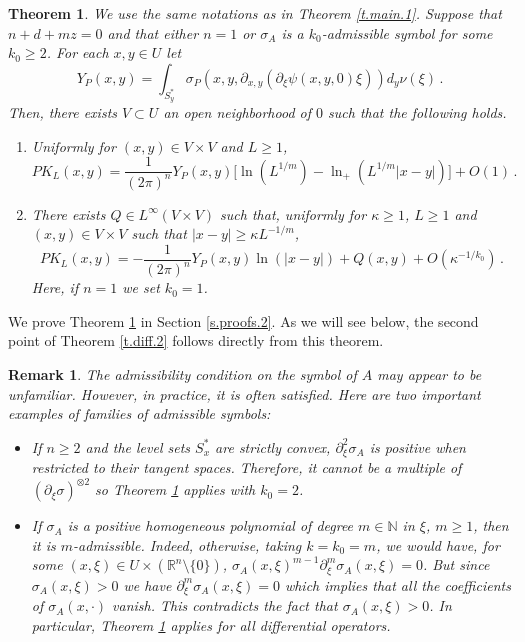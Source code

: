 \documentclass[10pt,twoside]{article}
\newcommand{\R}{\mathbb{R}}
\newcommand{\N}{\mathbb{N}}
\newtheorem{theorem}{Theorem}
\numberwithin{theorem}{section}
\newtheorem{remark}{Remark}
\begin{document}
\begin{theorem}\label{t.main.2}
We use the same notations as in Theorem \ref{t.main.1}. Suppose that $n+d+mz=0$ and that either $n=1$ or $\sigma_A$ is a $k_0$-admissible symbol for some $k_0\geq 2$. For each $x,y\in U$ let
\[
Y_P(x,y)=\int_{S^*_y}\sigma_P\left(x,y,\partial_{x,y}(\partial_\xi\psi(x,y,0)\xi)\right)d_y\nu(\xi)\, .
\]
Then, there exists $V\subset U$ an open neighborhood of $0$ such that the following holds.
\begin{enumerate}
\item Uniformly for $(x,y)\in V\times V$ and $L\geq 1$,
\[
PK_L(x,y)=\frac{1}{(2\pi)^n}Y_P(x,y)\Big[\ln\left(L^{1/m}\right)-\ln_+\left(L^{1/m}|x-y|\right)\Big]+O(1)\, .
\]
\item There exists $Q\in L^\infty(V\times V)$ such that, uniformly for  $\kappa\geq 1$, $L\geq 1$ and $(x,y)\in V\times V$ such that $|x-y|\geq \kappa L^{-1/m}$,
\[
PK_L(x,y)=-\frac{1}{(2\pi)^n}Y_P(x,y)\ln(|x-y|)+Q(x,y)+O\left(\kappa^{-1/k_0}\right)\, .
\]
Here, if $n=1$ we set $k_0=1$.
\end{enumerate}

\end{theorem}
We prove Theorem \ref{t.main.2} in Section \ref{s.proofs.2}. As we will see below, the second point of Theorem \ref{t.diff.2} follows directly from this theorem.
\begin{remark}\label{r.examples}
The admissibility condition on the symbol of $A$ may appear to be unfamiliar. However, in practice, it is often satisfied. Here are two important examples of families of admissible symbols:
\begin{itemize}
\item If $n\geq 2$ and the level sets $S^*_x$ are strictly convex, $\partial^2_\xi\sigma_A$ is positive when restricted to their tangent spaces. Therefore, it cannot be a multiple of $\left(\partial_\xi\sigma\right)^{\otimes 2}$ so Theorem \ref{t.main.2} applies with $k_0=2$.
\item If $\sigma_A$ is a positive homogeneous polynomial of degree $m\in\N$ in $\xi$, $m\geq 1$, then it is $m$-admissible. Indeed, otherwise, taking $k=k_0=m$, we would have, for some $(x,\xi)\in U\times\left(\R^n\setminus\{0\}\right)$, $\sigma_A(x,\xi)^{m-1}\partial_\xi^m\sigma_A(x,\xi)=0$. But since $\sigma_A(x,\xi)>0$ we have $\partial_\xi^m\sigma_A(x,\xi)=0$ which implies that all the coefficients of $\sigma_A(x,\cdot)$ vanish. This contradicts the fact that $\sigma_A(x,\xi)>0$. In particular, Theorem \ref{t.main.2} applies for all differential operators.
\end{itemize}
\end{remark}
\end{document}
